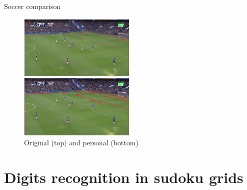 \documentclass[12pt, dvipsnames]{beamer}
\begin{document}
\begin{frame}{Soccer comparison}
    \begin{figure}
        \centering
        \includegraphics[width=0.5\textwidth]{resources/png/soccer-comparison.png}
        \caption{Original (top) and personal (bottom)}
    \end{figure}
\end{frame}


\section{Digits recognition in sudoku grids}
\end{document}
